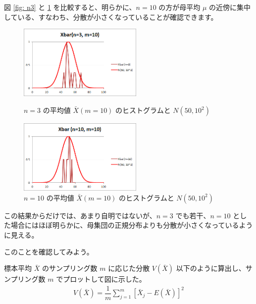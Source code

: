 \documentclass[uplatex,11pt,a4paper]{jsarticle}
\begin{document}
図 \ref{fig: n3} と \ref{fig: n10} を比較すると、明らかに、$n=10$ の方が母平均 $\mu$ の近傍に集中している、すなわち、分散が小さくなっていることが確認できます。
\begin{figure}[htb]
\begin{minipage}{0.5\hsize}
 \centering
	\includegraphics[width=6cm]{./figs/Xbar_n3M10.png}
	\caption{$n=3$ の平均値 $\bar{X} (m=10) $ のヒストグラムと $N(50, 10^2)$ }
	\label{fig: n3}
\end{minipage}
\begin{minipage}{0.5\hsize}
 \centering
	\includegraphics[width=6cm]{./figs/Xbar_n10M10.png}
	\caption{$n=10$ の平均値 $\bar{X} (m=10) $ のヒストグラムと $N(50, 10^2)$ }
	\label{fig: n10}
\end{minipage}
\end{figure}

この結果からだけでは、あまり自明ではないが、$n=3$ でも若干、$n=10$ とした場合にはほぼ明らかに、母集団の正規分布よりも分散が小さくなっているように見える。

このことを確認してみよう。

標本平均 $\bar{X}$ のサンプリング数 $m$ に応じた分散 $V(\bar{X})$ 以下のように算出し、サンプリング数 $m$ でプロットして図に示した。
\begin{align*}
V(\bar{X}) = \dfrac{1}{m} \sum_{j=1}^m [\bar{X}_j - E(\bar{X})]^2
\end{align*}
\end{document}
